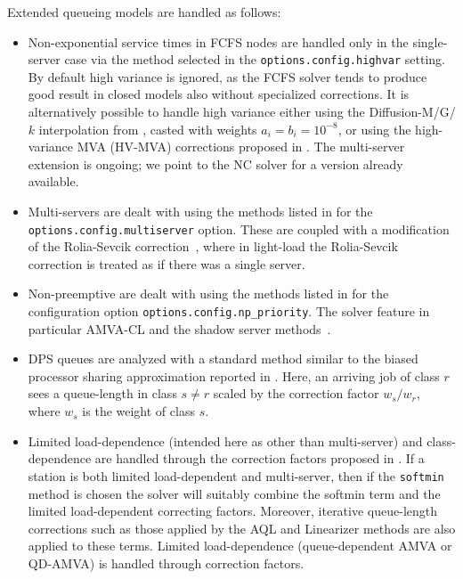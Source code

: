 Extended queueing models are handled as follows:

\begin{itemize}
    \item Non-exponential service times in FCFS nodes are handled only in the single-server case via the method selected in the \texttt{options.config.highvar} setting. By default high variance is ignored, as the FCFS solver tends to produce good result in closed models also without specialized corrections. It is alternatively possible to handle high variance either using the Diffusion-M/G/$k$ interpolation from \cite{Casale2020a}, casted with weights $a_i=b_i=10^{-8}$, or using the high-variance MVA (HV-MVA) corrections proposed in \cite{reis79,BonW86}. The multi-server extension is ongoing; we point to the NC solver for a version already available.
    \item Multi-servers are dealt with using the methods listed in  for the \texttt{options.config.multiserver} option. These are coupled with a modification of the Rolia-Sevcik correction~\cite{roli.sevc95}, where in light-load the Rolia-Sevcik correction is treated as if there was a single server.
        \item Non-preemptive are dealt with using the methods listed in   for the configuration option \texttt{options.config.np\_priority}. The solver feature in particular AMVA-CL and the shadow server methods~\cite{EagL88}.
    \item DPS queues are analyzed with a standard method similar to the biased processor sharing approximation reported in \cite[\S 11.4]{LazZGS84}. Here, an arriving job of class $r$ sees a queue-length in class $s\neq r$ scaled by the correction factor $w_s/w_r$, where $w_s$ is the weight of class $s$.
    \item Limited load-dependence (intended here as other than multi-server) and class-dependence are handled through the correction factors proposed in \cite{casale2015qdamva}. If a station is both limited load-dependent and multi-server, then if the \texttt{softmin} method is chosen the solver will suitably combine the softmin term and the limited load-dependent correcting factors. Moreover, iterative queue-length corrections such as those applied by the AQL and Linearizer methods are also applied to these terms. Limited load-dependence (queue-dependent AMVA or QD-AMVA) is handled through correction factors.

\end{itemize}
